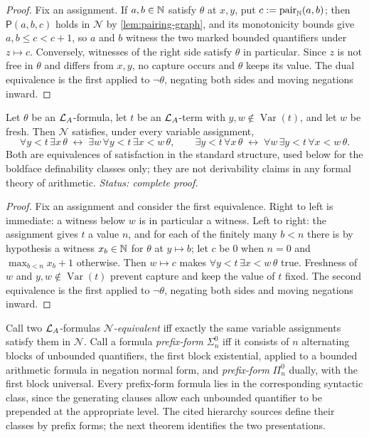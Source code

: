 \begin{proof}
Fix an assignment.  If \(a,b\in\mathbb{N}\) satisfy \(\theta\) at \(x,y\), put
\(c\mathrel{:=}\operatorname{pair}_{\mathbb{N}}(a,b)\); then \(\mathsf P(a,b,c)\) holds
in \(\mathcal N\) by \cref{lem:pairing-graph}, and its monotonicity bounds
give \(a,b\leq c<c+1\), so \(a\) and \(b\) witness the two marked bounded
quantifiers under \(z\mapsto c\).  Conversely, witnesses of the right side
satisfy \(\theta\) in particular.  Since \(z\) is not free in \(\theta\)
and differs from \(x,y\), no capture occurs and \(\theta\) keeps its
value.  The dual equivalence is the first applied to \(\neg\theta\),
negating both sides and moving negations inward.
\end{proof}

\begin{lemma}
\label{lem:bounded-collection}
Let \(\theta\) be an \(\mathcal{L}_A\)-formula, let \(t\) be an
\(\mathcal{L}_A\)-term with \(y,w\notin\operatorname{Var}(t)\), and let \(w\) be
fresh.  Then \(\mathcal N\) satisfies, under every variable assignment,
\[
  \forall y<t\,\exists x\,\theta
  \;\leftrightarrow\;
  \exists w\,\forall y<t\,\exists x<w\,\theta,
  \qquad
  \exists y<t\,\forall x\,\theta
  \;\leftrightarrow\;
  \forall w\,\exists y<t\,\forall x<w\,\theta.
\]
Both are equivalences of satisfaction in the standard structure, used
below for the boldface definability classes only; they are not
derivability claims in any formal theory of arithmetic.
\textit{Status: complete proof.}
\end{lemma}

\begin{proof}
Fix an assignment and consider the first equivalence.  Right to left is
immediate: a witness below \(w\) is in particular a witness.  Left to
right: the assignment gives \(t\) a value \(n\), and for each of the
finitely many \(b<n\) there is by hypothesis a witness \(x_b\in\mathbb{N}\) for
\(\theta\) at \(y\mapsto b\); let \(c\) be \(0\) when \(n=0\) and
\(\max_{b<n}x_b+1\) otherwise.  Then \(w\mapsto c\) makes
\(\forall y<t\,\exists x<w\,\theta\) true.  Freshness of \(w\) and
\(y,w\notin\operatorname{Var}(t)\) prevent capture and keep the value of
\(t\) fixed.  The second equivalence is the first applied to
\(\neg\theta\), negating both sides and moving negations inward.
\end{proof}

Call two \(\mathcal{L}_A\)-formulas \emph{\(\mathcal N\)-equivalent} iff exactly
the same variable assignments satisfy them in \(\mathcal N\).  Call a
formula \emph{prefix-form} \(\Sigma^0_n\) iff it consists of \(n\)
alternating blocks of unbounded quantifiers, the first block existential,
applied to a bounded arithmetic formula in negation normal form, and
\emph{prefix-form} \(\Pi^0_n\) dually, with the first block universal.
Every prefix-form formula lies in the corresponding syntactic class, since
the generating clauses allow each unbounded quantifier to be prepended at
the appropriate level.  The cited hierarchy sources define their classes
by prefix forms; the next theorem identifies the two presentations.

